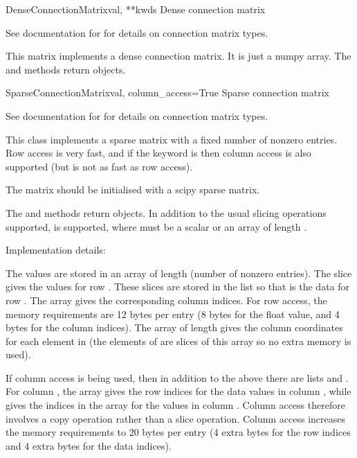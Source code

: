 \documentclass[letterpaper,10pt,english]{manual}
\begin{document}
\hypertarget{brian.DenseConnectionMatrix}{}\begin{classdesc}{DenseConnectionMatrix}{val, **kwds}
Dense connection matrix

See documentation for \hyperlink{brian.ConnectionMatrix}{} for details on
connection matrix types.

This matrix implements a dense connection matrix. It is just
a numpy array. The  and  methods return
 objects.
\end{classdesc}

\hypertarget{brian.SparseConnectionMatrix}{}\begin{classdesc}{SparseConnectionMatrix}{val, column\_access=True}
Sparse connection matrix

See documentation for \hyperlink{brian.ConnectionMatrix}{} for details on
connection matrix types.

This class implements a sparse matrix with a fixed number of nonzero
entries. Row access is very fast, and if the  keyword
is  then column access is also supported (but is not as fast
as row access).

The matrix should be initialised with a scipy sparse matrix.

The  and  methods return
\hyperlink{brian.SparseConnectionVector}{} objects. In addition to the
usual slicing operations supported,  is supported, where
 must be a scalar or an array of length .

Implementation details:

The values are stored in an array  of length  (number
of nonzero entries). The slice  gives
the values for row . These slices are stored in the list 
so that  is the data for row . The array 
gives the corresponding column  indices. For row access, the
memory requirements are 12 bytes per entry (8 bytes for the float value,
and 4 bytes for the column indices). The array  of length 
gives the column  coordinates for each element in  (the
elements of  are slices of this array so no extra memory is
used).

If column access is being used, then in addition to the above there are
lists  and . For column , the array
 gives the row indices for the data values in column ,
while  gives the indices in the array 
for the values in column . Column access therefore involves a
copy operation rather than a slice operation. Column access increases
the memory requirements to 20 bytes per entry (4 extra bytes for the
row indices and 4 extra bytes for the data indices).
\end{classdesc}
\end{document}
